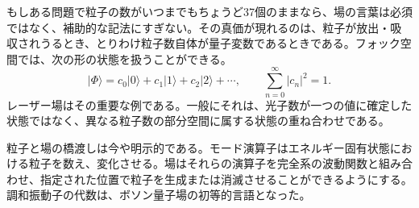 もしある問題で粒子の数がいつまでもちょうど37個のままなら、場の言葉は必須ではなく、補助的な記法にすぎない。その真価が現れるのは、粒子が放出・吸収されうるとき、とりわけ粒子数自体が量子変数であるときである。フォック空間では、次の形の状態を扱うことができる。
\begin{equation}
|\Phi\rangle
=c_0|0\rangle+c_1|1\rangle+c_2|2\rangle+\cdots,
\qquad
\sum_{n=0}^{\infty}|c_n|^2=1.
\end{equation}
レーザー場はその重要な例である。一般にそれは、光子数が一つの値に確定した状態ではなく、異なる粒子数の部分空間に属する状態の重ね合わせである。

粒子と場の橋渡しは今や明示的である。モード演算子はエネルギー固有状態における粒子を数え、変化させる。場はそれらの演算子を完全系の波動関数と組み合わせ、指定された位置で粒子を生成または消滅させることができるようにする。調和振動子の代数は、ボソン量子場の初等的言語となった。
